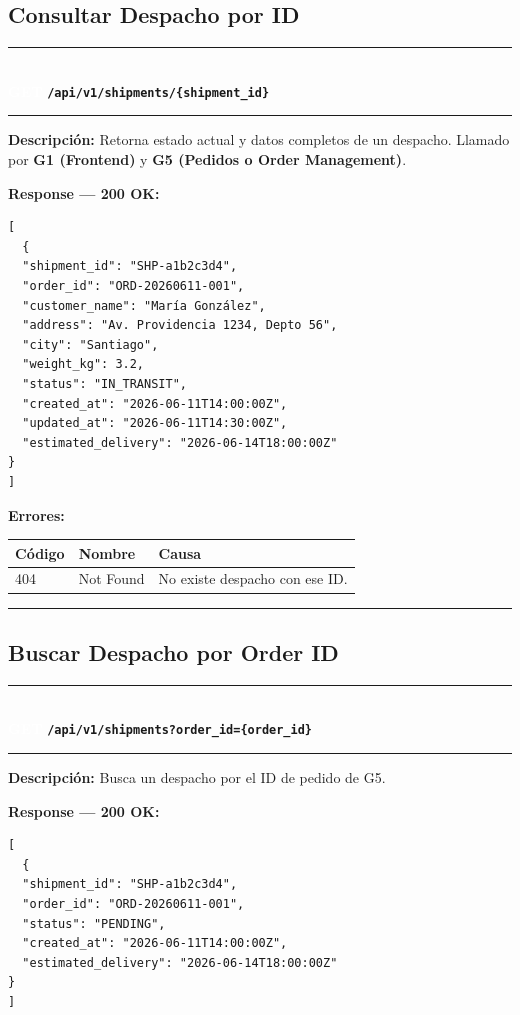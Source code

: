 \documentclass[11pt, a4paper]{article}
\newcommand{\httpmethod}[2]{%
  \colorbox{#1}{\textcolor{white}{\textbf{\small\textsf{#2}}}}%
}
\newcommand{\routeheader}[3]{%
  \noindent\rule{\textwidth}{1.5pt}\\[0.3em]
  \httpmethod{#1}{#2}\;\texttt{\bfseries #3}\\[0.3em]
  \rule{\textwidth}{0.4pt}
  \vspace{0.3cm}
}
\begin{document}
\subsection{Consultar Despacho por ID}

\routeheader{get}{GET}{/api/v1/shipments/\{shipment\_id\}}

\textbf{Descripción:} Retorna estado actual y datos completos de un despacho.
Llamado por \textbf{G1 (Frontend)} y \textbf{G5 (Pedidos o Order Management)}.

\vspace{0.3cm}
\textbf{Response --- 200 OK:}

\begin{lstlisting}
[
  {
  "shipment_id": "SHP-a1b2c3d4",
  "order_id": "ORD-20260611-001",
  "customer_name": "María González",
  "address": "Av. Providencia 1234, Depto 56",
  "city": "Santiago",
  "weight_kg": 3.2,
  "status": "IN_TRANSIT",
  "created_at": "2026-06-11T14:00:00Z",
  "updated_at": "2026-06-11T14:30:00Z",
  "estimated_delivery": "2026-06-14T18:00:00Z"
}
]
\end{lstlisting}

\textbf{Errores:}
\begin{table}[h!]
\small
\begin{tabularx}{\textwidth}{l l X}
  \toprule
  \textbf{Código} & \textbf{Nombre} & \textbf{Causa} \\
  \midrule
  404 & Not Found & No existe despacho con ese ID. \\
  \bottomrule
\end{tabularx}
\end{table}

\noindent\rule{\textwidth}{0.4pt}

\subsection{Buscar Despacho por Order ID}

\routeheader{get}{GET}{/api/v1/shipments?order\_id=\{order\_id\}}

\textbf{Descripción:} Busca un despacho por el ID de pedido de G5.

\vspace{0.3cm}
\textbf{Response --- 200 OK:}

\begin{lstlisting}
[
  {
  "shipment_id": "SHP-a1b2c3d4",
  "order_id": "ORD-20260611-001",
  "status": "PENDING",
  "created_at": "2026-06-11T14:00:00Z",
  "estimated_delivery": "2026-06-14T18:00:00Z"
}
]
\end{lstlisting}
\end{document}

